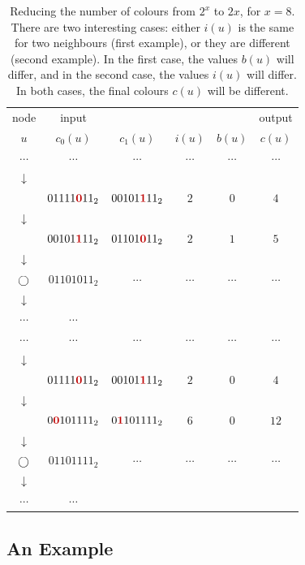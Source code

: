 \begin{table}
    \newcommand{\hl}[1]{\mathbf{\color{hlcolor}#1}}
    \newcommand{\node}{\raisebox{-1pt}{$\bigcirc$}}
    \newcommand{\mylf}{\\[-2pt]}
    \center
    \begin{tabular}{@{}c@{\qquad}ccccc@{}}
    \toprule
    node & input &&&& output \\
    $u$ & $c_0(u)$ & $c_1(u)$ & $i(u)$ & $b(u)$ & $c(u)$ \\
    \midrule
    $\cdots$ & $\cdots$ & $\cdots$ & $\cdots$ & $\cdots$ & $\cdots$ \mylf
    $\downarrow$ \mylf
    \node & $01111\hl{0}11_2$ & $00101\hl{1}11_2$ & $2$ & $0$ & $4$ \mylf
    $\downarrow$ \mylf
    \node & $00101\hl{1}11_2$ & $01101\hl{0}11_2$ & $2$ & $1$ & $5$ \mylf
    $\downarrow$ \mylf
    $\node$ & $01101011_2$ & $\cdots$ & $\cdots$ & $\cdots$ & $\cdots$ \mylf
    $\downarrow$ \mylf
    $\cdots$ & $\cdots$ \mylf
    \midrule
    $\cdots$ & $\cdots$ & $\cdots$ & $\cdots$ & $\cdots$ & $\cdots$ \mylf
    $\downarrow$ \mylf
    \node & $01111\hl{0}11_2$ & $00101\hl{1}11_2$ & $2$ & $0$ & $4$ \mylf
    $\downarrow$ \mylf
    \node & $0\hl{0}101111_2$ & $0\hl{1}101111_2$ & $6$ & $0$ & $12$ \mylf
    $\downarrow$ \mylf
    $\node$ & $01101111_2$ & $\cdots$ & $\cdots$ & $\cdots$ & $\cdots$ \mylf
    $\downarrow$ \mylf
    $\cdots$ & $\cdots$ \mylf
    \bottomrule
    \end{tabular}
    \caption{Reducing the number of colours from $2^x$ to $2x$, for $x = 8$. There are two interesting cases: either $i(u)$ is the same for two neighbours (first example), or they are different (second example). In the first case, the values $b(u)$ will differ, and in the second case, the values $i(u)$ will differ. In both cases, the final colours $c(u)$ will be different.}\label{tab:intro-id-fast}
\end{table}


\subsection{An Example}

